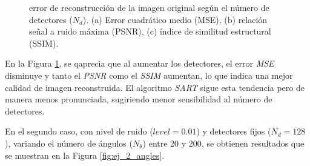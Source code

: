 \documentclass[11pt, twocolumn]{article}
\begin{document}
\begin{figure}[htbp]
  \centering
  \hfill
  \hfill
  \hfill
  \caption{error de reconstrucción de la imagen original según el número de detectores ($N_d$). (a) Error cuadrático medio (MSE), (b) relación señal a ruido máxima (PSNR), (c) índice de similitud estructural (SSIM).}
  \label{fig:ej_2_detec}
\end{figure}
En la Figura \ref{fig:ej_2_detec}, se qaprecia que al aumentar los detectores, el error \textit{MSE} disminuye y tanto el \textit{PSNR} como el \textit{SSIM} aumentan, lo que indica una mejor calidad de imagen reconstruida. El algoritmo \textit{SART} sigue esta tendencia pero de manera menos pronunciada, sugiriendo menor sensibilidad al número de detectores. 

En el segundo caso, con nivel de ruido ($level = 0.01$) y detectores fijos ($N_d = 128$), variando el número de ángulos ($N_\theta$) entre 20 y 200, se obtienen resultados que se muestran en la Figura \ref{fig:ej_2_angles}.
\end{document}
